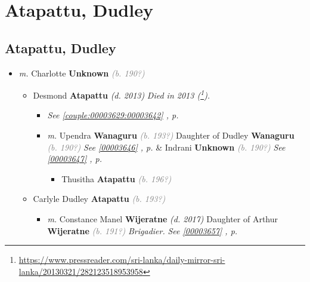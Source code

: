 \documentclass[10pt, openany]{book}
\begin{document}
 
\part{Atapattu, Dudley}
\chapter{Atapattu, Dudley}
\label{00003653}
\textcolor{slmaroon}{\textit{}}
\begin{itemize}
\item{\textit{m.} Charlotte \textbf{Unknown} \textcolor{gray}{\textit{(b. 190?)}}   \label{couple:00003653:00003654} \begin{itemize}
\item{Desmond \textbf{Atapattu} \textcolor{slorange}{\textit{(d. 2013)}} \textcolor{slmaroon}{\textit{Died in 2013 (\footnote{\url{https://www.pressreader.com/sri-lanka/daily-mirror-sri-lanka/20130321/282123518953958}}).}}
\begin{itemize}
\item{\textcolor{slteal}{\textit{See  \autoref{couple:00003629:00003642} \textit{, p. \pageref{couple:00003629:00003642} }}}}
\item{\textit{m.} Upendra  \textbf{Wanaguru} \textcolor{gray}{\textit{(b. 193?)}} Daughter of  Dudley \textbf{Wanaguru} \textcolor{gray}{\textit{(b. 190?)}} \textcolor{slteal}{\textit{See  \autoref{00003646} \textit{, p. \pageref{00003646} }}}  \&  Indrani \textbf{Unknown} \textcolor{gray}{\textit{(b. 190?)}} \textcolor{slteal}{\textit{See  \autoref{00003647} \textit{, p. \pageref{00003647} }}}   \label{couple:00003642:00003645} \begin{itemize}
\item{Thusitha \textbf{Atapattu} \textcolor{gray}{\textit{(b. 196?)}}
 }
\end{itemize}}
\end{itemize}
 }
\item{Carlyle Dudley \textbf{Atapattu} \textcolor{gray}{\textit{(b. 193?)}}
\begin{itemize}
\item{\textit{m.} Constance Manel \textbf{Wijeratne} \textcolor{slorange}{\textit{(d. 2017)}} Daughter of  Arthur \textbf{Wijeratne} \textcolor{gray}{\textit{(b. 191?)}} \textcolor{slmaroon}{\textit{Brigadier.}} \textcolor{slteal}{\textit{See  \autoref{00003657} \textit{, p. \pageref{00003657} }}}   \label{couple:00003655:00003656} \begin{itemize}

\end{itemize}}
\end{itemize}}
\end{itemize}}
\end{itemize}
\end{document}
